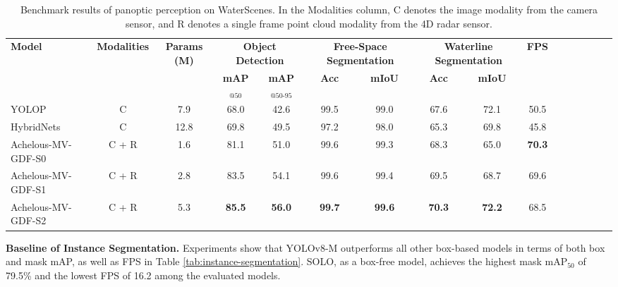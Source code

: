 \documentclass[lettersize,journal]{IEEEtran}
\begin{document}
\begin{table*}[!h]
\setlength\tabcolsep{5pt}
\caption{Benchmark results of panoptic perception on WaterScenes. In the Modalities column, C denotes the image modality from the camera sensor, and R denotes a single frame point cloud modality from the 4D radar sensor.}
\center
\footnotesize
\begin{tabular}{lccccccccccccccc}
\toprule
\multicolumn{1}{l}{\multirow{2}[2]{*}{\textbf{Model}}} & 
\multicolumn{1}{c}{\multirow{2}[2]{*}{\textbf{Modalities}}} &
\multicolumn{1}{c}{\multirow{2}[2]{*}{\textbf{Params (M)}}} &
\multicolumn{2}{c}{\bf{Object Detection}} &
\multicolumn{2}{c}{\bf{Free-Space Segmentation}} & 
\multicolumn{2}{c}{\bf{Waterline Segmentation}} & \multicolumn{1}{c}{\multirow{2}[2]{*}{\textbf{FPS}}}
  \\ \cmidrule(lr){4-5}\cmidrule(lr){6-7}\cmidrule(lr){8-9}
\multicolumn{3}{c}{} & \bf{mAP$_{@50}$} & \bf{mAP$_{@50\text{-}95}$} & \bf{Acc} & \bf{mIoU} & \bf{Acc} & \bf{mIoU}      
\\\midrule
YOLOP \cite{wu2022yolop} & C & 7.9 & 68.0 & 42.6 & 99.5 & 99.0 & 67.6 & 72.1 & 50.5 \\\midrule
HybridNets \cite{vu2022hybridnets} & C & 12.8 & 69.8 & 49.5 & 97.2 & 98.0 & 65.3 & 69.8 & 45.8\\\midrule
Achelous-MV-GDF-S0 \cite{guan2023achelous} & C + R & 1.6 & 81.1 & 51.0 & 99.6 & 99.3 & 68.3 & 65.0 & \bf{70.3} \\\midrule
Achelous-MV-GDF-S1 \cite{guan2023achelous} & C + R & 2.8 & 83.5 & 54.1 & 99.6 & 99.4 & 69.5 & 68.7 & 69.6  \\\midrule
Achelous-MV-GDF-S2 \cite{guan2023achelous} & C + R & 5.3 & \bf{85.5} & \bf{56.0} & \bf{99.7} & \bf{99.6} & \bf{70.3} & \bf{72.2} & 68.5  \\\midrule
\end{tabular}
\label{tab:multi-task}
\end{table*}


\textbf{Baseline of Instance Segmentation.} 
Experiments show that YOLOv8-M outperforms all other box-based models in terms of both box and mask mAP, as well as FPS in Table \ref{tab:instance-segmentation}. SOLO, as a box-free model, achieves the highest mask mAP$_{50}$ of 79.5\% and the lowest FPS of 16.2 among the evaluated models.
\end{document}
